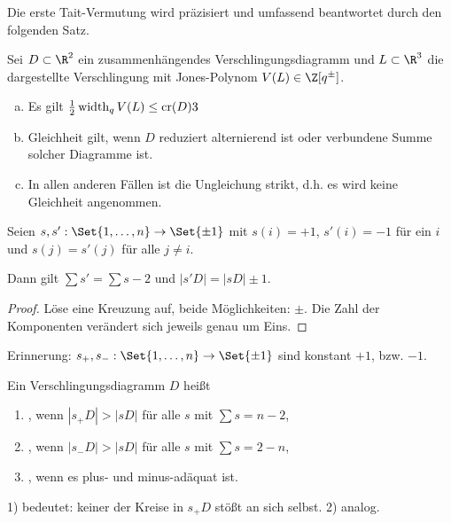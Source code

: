 Die erste Tait-Vermutung wird präzisiert und umfassend beantwortet durch den folgenden Satz.

\begin{st}
    Sei $D \subset \R^2$ ein zusammenhängendes Verschlingungsdiagramm und $L \subset \R^3$ die dargestellte Verschlingung mit Jones-Polynom $V(L) \in \Z[q^\pm]$.
    \begin{enumerate}[a)]
        \item
            Es gilt
            \begin{math}
                \frac{1}{2} \operatorname{width}_q V(L) \le \operatorname{cr}(D)3
            \end{math}
        \item
            Gleichheit gilt, wenn $D$ reduziert alternierend ist oder verbundene Summe solcher Diagramme ist.
        \item
            In allen anderen Fällen ist die Ungleichung strikt, d.h. es wird keine Gleichheit angenommen.
    \end{enumerate}
\end{st}



\begin{lem}
    Seien $s, s': \Set{1, \dotsc, n} \to \Set{\pm 1}$ mit $s(i) = +1$, $s'(i) = - 1$ für ein $i$ und $s(j) = s'(j)$ für alle $j \neq i$.

    Dann gilt $\sum s' = \sum s - 2$ und $|s'D| = |sD| \pm 1$.
    \begin{proof}
        Löse eine Kreuzung auf, beide Möglichkeiten: $\pm$.
        Die Zahl der Komponenten verändert sich jeweils genau um Eins.
    \end{proof}
\end{lem}

Erinnerung: $s_+, s_-: \Set{1, \dotsc, n} \to \Set{\pm 1}$ sind konstant $+1$, bzw. $-1$.

\begin{df}
    Ein Verschlingungsdiagramm $D$ heißt
    \begin{enumerate}[1)]
        \item
            , wenn $|s_+ D| > |sD|$ für alle $s$ mit $\sum s = n - 2$,
        \item
            , wenn $|s_- D| > |sD|$ für alle $s$ mit $\sum s = 2 - n$,
        \item
            , wenn es plus- und minus-adäquat ist.
    \end{enumerate}
    \begin{nt}
        1) bedeutet: keiner der Kreise in $s_+ D$ stößt an sich selbst.
        2) analog.
    \end{nt}
\end{df}

